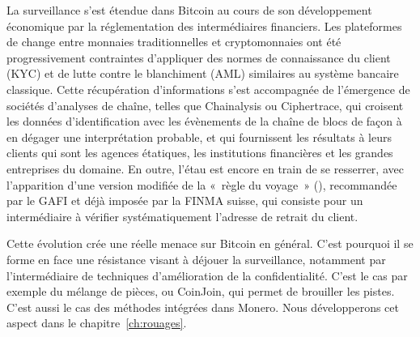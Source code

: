 La surveillance s'est étendue dans Bitcoin au cours de son développement économique par la réglementation des intermédiaires financiers. Les plateformes de change entre monnaies traditionnelles et cryptomonnaies ont été progressivement contraintes d'appliquer des normes de connaissance du client (KYC) et de lutte contre le blanchiment (AML) similaires au système bancaire classique. Cette récupération d'informations s'est accompagnée de l'émergence de sociétés d'analyses de chaîne, telles que Chainalysis ou Ciphertrace, qui croisent les données d'identification avec les évènements de la chaîne de blocs de façon à en dégager une interprétation probable, et qui fournissent les résultats à leurs clients qui sont les agences étatiques, les institutions financières et les grandes entreprises du domaine. En outre, l'étau est encore en train de se resserrer, avec l'apparition d'une version modifiée de la «~règle du voyage~» (), recommandée par le GAFI et déjà imposée par la FINMA suisse, qui consiste pour un intermédiaire à vérifier systématiquement l'adresse de retrait du client.

Cette évolution crée une réelle menace sur Bitcoin en général. C'est pourquoi il se forme en face une résistance visant à déjouer la surveillance, notamment par l'intermédiaire de techniques d'amélioration de la confidentialité. C'est le cas par exemple du mélange de pièces, ou CoinJoin, qui permet de brouiller les pistes. C'est aussi le cas des méthodes intégrées dans Monero. Nous développerons cet aspect dans le chapitre~\ref{ch:rouages}. %

